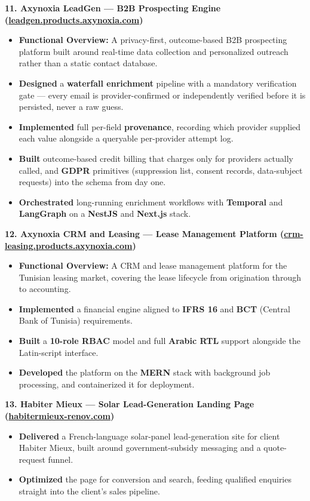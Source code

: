 \documentclass[10pt, letterpaper]{article}
\newenvironment{highlights}{
\begin{itemize}[leftmargin=12pt, itemsep=2pt]
}{
\end{itemize}
}
\begin{document}
\textbf{11. Axynoxia LeadGen --- B2B Prospecting Engine (\href{https://leadgen.products.axynoxia.com}{leadgen.products.axynoxia.com})}
\begin{highlights}
\item \textbf{Functional Overview:} A privacy-first, outcome-based B2B prospecting platform built around real-time data collection and personalized outreach rather than a static contact database.
\item \textbf{Designed} a \textbf{waterfall enrichment} pipeline with a mandatory verification gate --- every email is provider-confirmed or independently verified before it is persisted, never a raw guess.
\item \textbf{Implemented} full per-field \textbf{provenance}, recording which provider supplied each value alongside a queryable per-provider attempt log.
\item \textbf{Built} outcome-based credit billing that charges only for providers actually called, and \textbf{GDPR} primitives (suppression list, consent records, data-subject requests) into the schema from day one.
\item \textbf{Orchestrated} long-running enrichment workflows with \textbf{Temporal} and \textbf{LangGraph} on a \textbf{NestJS} and \textbf{Next.js} stack.
\end{highlights}

\textbf{12. Axynoxia CRM and Leasing --- Lease Management Platform (\href{https://crm-leasing.products.axynoxia.com}{crm-leasing.products.axynoxia.com})}
\begin{highlights}
\item \textbf{Functional Overview:} A CRM and lease management platform for the Tunisian leasing market, covering the lease lifecycle from origination through to accounting.
\item \textbf{Implemented} a financial engine aligned to \textbf{IFRS 16} and \textbf{BCT} (Central Bank of Tunisia) requirements.
\item \textbf{Built} a \textbf{10-role RBAC} model and full \textbf{Arabic RTL} support alongside the Latin-script interface.
\item \textbf{Developed} the platform on the \textbf{MERN} stack with background job processing, and containerized it for deployment.
\end{highlights}

\textbf{13. Habiter Mieux --- Solar Lead-Generation Landing Page (\href{https://habitermieux-renov.com}{habitermieux-renov.com})}
\begin{highlights}
\item \textbf{Delivered} a French-language solar-panel lead-generation site for client Habiter Mieux, built around government-subsidy messaging and a quote-request funnel.
\item \textbf{Optimized} the page for conversion and search, feeding qualified enquiries straight into the client's sales pipeline.
\end{highlights}
\end{document}
